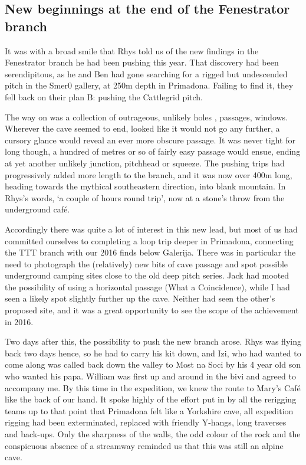 \subsection{New beginnings at the end of the Fenestrator branch}

It was with a broad smile that Rhys told us of the new findings in the Fenestrator branch he had been pushing this year. That discovery had been serendipitous, as he and Ben had gone searching for a rigged but undescended pitch in the Smer0 gallery, at 250m depth in Primadona. Failing to find it, they fell back on their plan B: pushing the Cattlegrid pitch.

The way on was a collection of  outrageous, unlikely holes , passages, windows. Wherever the cave seemed to end, looked like it would not go any further, a cursory glance would reveal an ever more obscure passage. It was never tight for long though, a hundred of metres or so of fairly easy passage would ensue, ending at yet another unlikely junction, pitchhead or squeeze. The pushing trips had progressively added more length to the branch, and it was now over 400m long, heading towards the mythical southeastern direction, into blank mountain. In Rhys’s words, ‘a couple of hours round trip’, now at a stone’s throw from the underground café. 

Accordingly there was quite a lot of interest in this new lead, but most of us had committed ourselves to completing a loop trip  deeper in Primadona, connecting the TTT branch with our 2016 finds below Galerija. There was in particular the need to photograph the (relatively) new bits of cave passage and spot possible underground camping sites close to the old deep pitch series. Jack had mooted the possibility of using a horizontal passage (What a Coincidence), while I had seen a likely spot slightly further up the cave. Neither had seen the other’s proposed site, and it was a great opportunity to see the scope of the achievement in 2016. 

Two days after this, the possibility to push the new branch arose.  Rhys was flying back two days hence, so he had to carry his kit down, and Izi, who had wanted to come along was called back down the valley to Most na Soci by his 4 year old son who wanted his papa. William was first up and around in the bivi and agreed to accompany me. By this time in the expedition, we knew the route to Mary’s Café like the back of our hand. It spoke highly of the effort put in by all the rerigging teams up to that point that Primadona felt like a Yorkshire cave, all expedition rigging had been exterminated, replaced with friendly Y-hangs, long traverses and back-ups.  Only the sharpness of the walls, the odd colour of the rock and the conspicuous absence of a streamway reminded us that this was still an alpine cave.

